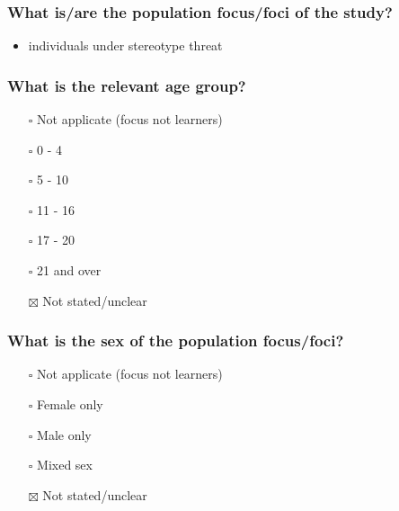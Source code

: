 \documentclass[
  doc, a4paper]{apa7}
\providecommand{\tightlist}{%
  \setlength{\itemsep}{0pt}\setlength{\parskip}{0pt}}
\begin{document}
\subsubsection{What is/are the population focus/foci of the study?}\label{what-isare-the-population-focusfoci-of-the-study}

\begin{itemize}
\tightlist
\item
  individuals under stereotype threat
\end{itemize}

\subsubsection{What is the relevant age group?}\label{what-is-the-relevant-age-group}

\begin{itemize}
\tightlist
\item[$\square$]
  Not applicate (focus not learners)\\
\item[$\square$]
  0 - 4\\
\item[$\square$]
  5 - 10\\
\item[$\square$]
  11 - 16\\
\item[$\square$]
  17 - 20\\
\item[$\square$]
  21 and over\\
\item[$\boxtimes$]
  Not stated/unclear
\end{itemize}

\subsubsection{What is the sex of the population focus/foci?}\label{what-is-the-sex-of-the-population-focusfoci}

\begin{itemize}
\tightlist
\item[$\square$]
  Not applicate (focus not learners)\\
\item[$\square$]
  Female only\\
\item[$\square$]
  Male only\\
\item[$\square$]
  Mixed sex\\
\item[$\boxtimes$]
  Not stated/unclear
\end{itemize}
\end{document}

